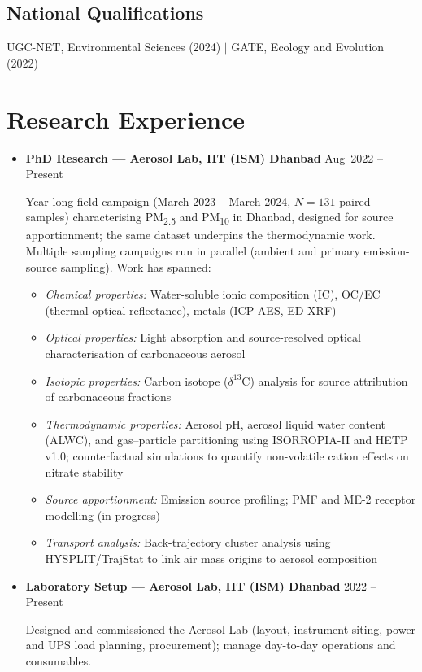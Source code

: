 \documentclass[11pt, a4paper]{article}
\begin{document}
\vspace{-0.3em}
\subsection*{National Qualifications}
UGC-NET, Environmental Sciences (2024) \quad $\vert$ \quad GATE, Ecology and Evolution (2022)

\section*{Research Experience}
\begin{itemize}[leftmargin=*]
    \item \textbf{PhD Research --- Aerosol Lab, IIT (ISM) Dhanbad}
    \hfill\mbox{Aug 2022} -- Present

    Year-long field campaign (March 2023 -- March 2024, $N = 131$ paired samples)
    characterising PM\textsubscript{2.5} and PM\textsubscript{10}
    in Dhanbad, designed for source apportionment; the same dataset underpins the
    thermodynamic work. Multiple sampling campaigns run in parallel (ambient and
    primary emission-source sampling). Work has spanned:
    \begin{itemize}
        \item \textit{Chemical properties:} Water-soluble ionic
        composition (IC), OC/EC (thermal-optical reflectance),
        metals (ICP-AES, ED-XRF)
        \item \textit{Optical properties:} Light absorption and
        source-resolved optical characterisation of carbonaceous
        aerosol
        \item \textit{Isotopic properties:} Carbon isotope
        ($\delta^{13}$C) analysis for source attribution of
        carbonaceous fractions
        \item \textit{Thermodynamic properties:} Aerosol pH, aerosol
        liquid water content (ALWC), and gas--particle partitioning
        using ISORROPIA-II and HETP v1.0; counterfactual simulations
        to quantify non-volatile cation effects on nitrate stability
        \item \textit{Source apportionment:} Emission source
        profiling; PMF and ME-2 receptor modelling (in progress)
        \item \textit{Transport analysis:} Back-trajectory cluster
        analysis using HYSPLIT/TrajStat to link air mass origins
        to aerosol composition
    \end{itemize}

    \item \textbf{Laboratory Setup --- Aerosol Lab, IIT (ISM) Dhanbad}
    \hfill 2022 -- Present

    Designed and commissioned the Aerosol Lab (layout, instrument siting,
    power and UPS load planning, procurement); manage day-to-day operations
    and consumables.
\end{itemize}
\end{document}
